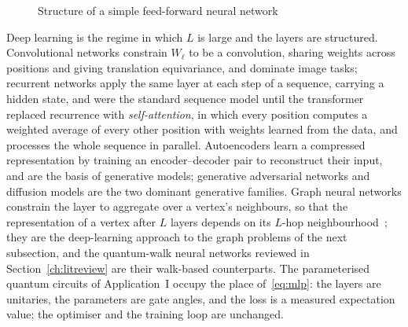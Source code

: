 \begin{figure}[htbp]
	\centering
	\caption{Structure of a simple feed-forward neural network}%
	\label{fig: neural_network}
\end{figure}

Deep learning is the regime in which $L$ is large and the layers are
structured. Convolutional networks constrain $W_\ell$ to be a convolution,
sharing weights across positions and giving translation equivariance, and
dominate image tasks; recurrent networks apply the same layer at each step of
a sequence, carrying a hidden state, and were the standard sequence model
until the transformer~\cite{NIPS2017_3f5ee243} replaced recurrence with
\emph{self-attention}, in which every position computes a weighted average of
every other position with weights learned from the data, and processes the
whole sequence in parallel. Autoencoders learn a compressed representation
by training an encoder--decoder pair to reconstruct their input, and are the
basis of generative models; generative adversarial networks and diffusion
models are the two dominant generative families. Graph neural networks
constrain the layer to aggregate over a vertex's neighbours, so that the
representation of a vertex after $L$ layers depends on its $L$-hop
neighbourhood~\cite{NIPS2017_5dd9db5e}; they are the deep-learning approach
to the graph problems of the next subsection, and the quantum-walk neural
networks reviewed in Section~\ref{ch:litreview} are their walk-based
counterparts. The parameterised quantum circuits of Application~I occupy the
place of~\eqref{eq:mlp}: the layers are unitaries, the parameters are gate
angles, and the loss is a measured expectation value; the optimiser and the
training loop are unchanged.

